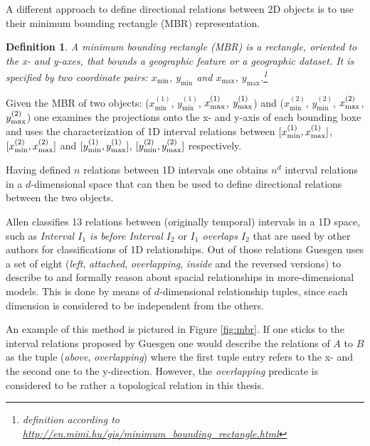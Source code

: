\documentclass[paper=a4, fontsize=11pt]{scrartcl} %
\numberwithin{equation}{section} %
\numberwithin{figure}{section} %
\numberwithin{table}{section} %
\newtheorem{mydef}{Definition}
\begin{document}
A different approach to define directional relations between 2D objects is to use their minimum bounding rectangle (MBR) representation.

\begin{mydef}
  A minimum bounding rectangle (MBR) is a rectangle, oriented to the x- and y-axes, that bounds a geographic feature or a geographic dataset. It is specified by two coordinate pairs: $x_{\mathrm{min}}$, $y_{\mathrm{min}}$ and $x_{\mathrm{max}}$, $y_{\mathrm{max}}$.\footnote{definition according to \url{http://en.mimi.hu/gis/minimum_bounding_rectangle.html}}
\end{mydef}

Given the MBR of two objects: ($x^{(1)}_{\mathrm{min}}$, $y^{(1)}_{\mathrm{min}}$, $x^{(1)}_{\vphantom{\mathrm{i}}\mathrm{max}}$, $y^{(1)}_{\vphantom{\mathrm{i}}\mathrm{max}}$) and ($x^{(2)}_{\mathrm{min}}$, $y^{(2)}_{\mathrm{min}}$, $x^{(2)}_{\vphantom{\mathrm{i}}\mathrm{max}}$, $y^{(2)}_{\vphantom{\mathrm{i}}\mathrm{max}}$) one examines the projections onto the x- and y-axis of each bounding boxe and uses the characterization of 1D interval relations between $[x^{(1)}_{\mathrm{min}}, x^{(1)}_{\vphantom{\mathrm{i}}\mathrm{max}}]$, $[x^{(2)}_{\mathrm{min}}, x^{(2)}_{\vphantom{\mathrm{i}}\mathrm{max}}]$ and $[y^{(1)}_{\mathrm{min}}, y^{(1)}_{\vphantom{\mathrm{i}}\mathrm{max}}]$, $[y^{(2)}_{\mathrm{min}}, y^{(2)}_{\vphantom{\mathrm{i}}\mathrm{max}}]$ respectively. 
 
Having defined $n$ relations between 1D intervals one obtains $n^d$ interval relations in a $d$-dimensional space that can then be used to define directional relations between the two objects. 

Allen \cite{Allen:1983:MKT:182.358434} classifies 13 relations between (originally temporal) intervals in a 1D space, such as \textit{Interval $I_1$ is before Interval $I_2$} or \textit{$I_1$ overlaps $I_2$} that are used by other authors for classifications of 1D relationships. Out of those relations Guesgen \cite{guesgen1989spatial} uses a set of eight (\emph{left}, \emph{attached}, \emph{overlapping}, \emph{inside} and the reversed versions) to describe to and formally reason about spacial relationships in more-dimensional models. This is done by means of $d$-dimensional relationship tuples, since each dimension is considered to be independent from the others. 

An example of this method is pictured in Figure \ref{fig:mbr}. If one sticks to the interval relations proposed by Guesgen one would describe the relations of $A$ to $B$ as the tuple (\emph{above}, \emph{overlapping}) where the first tuple entry refers to the x- and the second one to the y-direction. However, the \emph{overlapping} predicate is considered to be rather a topological relation in this thesis. 
\end{document}
